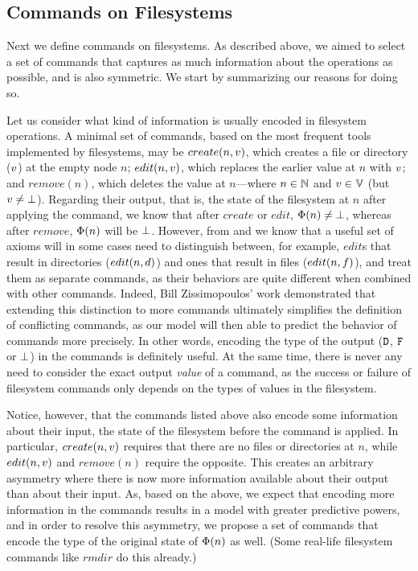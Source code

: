 
\subsection{Commands on Filesystems}


Next we define commands on filesystems.
As described above, we aimed to select a set of commands
that captures as much information
about the operations as possible, and is also symmetric.
We start by summarizing our reasons for doing so.

Let us consider what kind of information is usually encoded in filesystem operations.
A minimal set of commands, based on the most frequent tools implemented by filesystems,
may be $create(n,v)$, which creates a file or directory ($v$) at the empty node $n$;
$edit(n,v)$, which replaces the earlier value at $n$ with $v$;
and $remove(n)$, which deletes the value at $n$---where 
$n\in\mathbb{N}$ and $v\in\mathbb{V}$ (but $v\neq\bot$).
Regarding their output, that is, the state of the filesystem at $n$
after applying the command,
we know that after $create$ or $edit$, $\Phi(n)\neq\bot$, whereas after $remove$,
$\Phi(n)$ will be $\bot$. 
However, from \cite{NREC} and \cite{CBNR} we know that a useful set of axioms
will in some cases need to distinguish between, for example,
$edit$s that result in directories ($edit(n,d)$) and
ones that result in files ($edit(n,f)$), and treat them as separate commands,
as their behaviors are quite different when combined with other commands.
Indeed, Bill Zissimopoulos' work
demonstrated \cite{BZ}
that extending this distinction to more commands ultimately simplifies
the definition of conflicting commands, as our model will then able to predict the behavior of commands
more precisely.
In other words, encoding the type of the output ($\mathtt{D}$, $\mathtt{F}$ or $\bot$) in the commands is definitely useful.
At the same time, there is never any need to consider the
exact output \emph{value} of a command,
as the success or failure of filesystem commands only depends on the types of values in the filesystem.

Notice, however, that the commands listed above also encode some information about 
their input, the state of the filesystem
before the command is applied. In particular, $create(n,v)$ requires that there are no files
or directories at $n$, while $edit(n,v)$ and $remove(n)$ require the opposite.
This creates an arbitrary asymmetry where
there is now more information available about their output than about their input.
As, based on the above, we expect that encoding more information in the commands
results in a model with greater predictive powers,
and in order to resolve this asymmetry, 
we propose a set of commands that encode
the type of the original state of $\Phi(n)$ as well.
(Some real-life filesystem commands like $rmdir$ do this already.)

